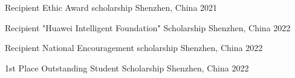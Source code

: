 \begin{cvhonors}

\cvhonor
    {Recipient} %
    {Ethic Award scholarship} %
    {Shenzhen, China} %
    {2021} %

    \cvhonor
    {Recipient} %
    {"Huawei Intelligent Foundation" Scholarship} %
    {Shenzhen, China} %
    {2022} %


  \cvhonor
    {Recipient} %
    {National Encouragement scholarship} %
    {Shenzhen, China} %
    {2022} %

  \cvhonor
    {1st Place} %
    {Outstanding Student Scholarship} %
    {Shenzhen, China} %
    {2022} %


\end{cvhonors}

